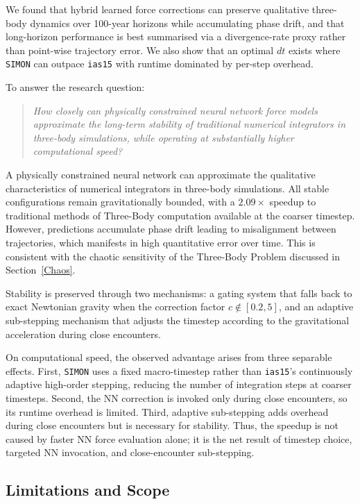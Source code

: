 \documentclass[12pt]{article}
\begin{document}
We found that hybrid learned force corrections can preserve qualitative three-body dynamics over 100-year horizons while accumulating phase drift, and that long-horizon performance is best summarised via a divergence-rate proxy rather than point-wise trajectory error. We also show that an optimal $dt$ exists where \texttt{SIMON} can outpace \texttt{ias15} with runtime dominated by per-step overhead.

To answer the research question:
\begin{quote}
\emph{How closely can physically constrained neural network force models approximate the long-term stability of traditional numerical integrators in three-body simulations, while operating at substantially higher computational speed?}
\end{quote}

\noindent A physically constrained neural network can approximate the qualitative characteristics of numerical integrators in three-body simulations. All stable configurations remain gravitationally bounded, with a $2.09\times$ speedup to traditional methods of Three-Body computation available at the coarser timestep. However, predictions accumulate phase drift leading to misalignment between trajectories, which manifests in high quantitative error over time. This is consistent with the chaotic sensitivity of the Three-Body Problem discussed in Section~\ref{Chaos}.

Stability is preserved through two mechanisms: a gating system that falls back to exact Newtonian gravity when the correction factor $c \notin [0.2, 5]$, and an adaptive sub-stepping mechanism that adjusts the timestep according to the gravitational acceleration during close encounters.

On computational speed, the observed advantage arises from three separable effects. First, \texttt{SIMON} uses a fixed macro-timestep rather than \texttt{ias15}'s continuously adaptive high-order stepping, reducing the number of integration steps at coarser timesteps. Second, the NN correction is invoked only during close encounters, so its runtime overhead is limited. Third, adaptive sub-stepping adds overhead during close encounters but is necessary for stability. Thus, the speedup is not caused by faster NN force evaluation alone; it is the net result of timestep choice, targeted NN invocation, and close-encounter sub-stepping.

\subsection{Limitations and Scope}
\end{document}
